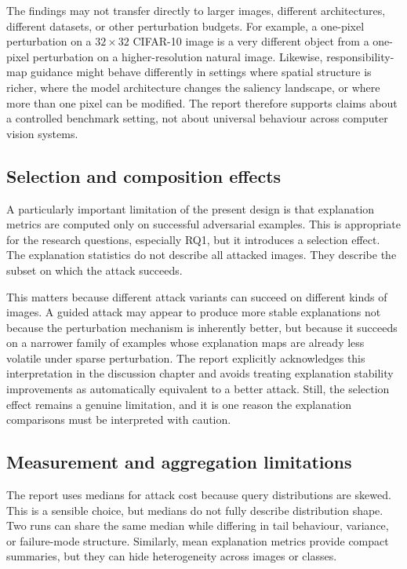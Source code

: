 The findings may not transfer directly to larger images, different architectures, different datasets, or other perturbation budgets.
For example, a one-pixel perturbation on a $32\times 32$ CIFAR-10 image is a very different object from a one-pixel perturbation on a higher-resolution natural image.
Likewise, responsibility-map guidance might behave differently in settings where spatial structure is richer, where the model architecture changes the saliency landscape, or where more than one pixel can be modified.
The report therefore supports claims about a controlled benchmark setting, not about universal behaviour across computer vision systems.

\subsection{Selection and composition effects}
A particularly important limitation of the present design is that explanation metrics are computed only on successful adversarial examples.
This is appropriate for the research questions, especially RQ1, but it introduces a selection effect.
The explanation statistics do not describe all attacked images.
They describe the subset on which the attack succeeds.

This matters because different attack variants can succeed on different kinds of images.
A guided attack may appear to produce more stable explanations not because the perturbation mechanism is inherently better, but because it succeeds on a narrower family of examples whose explanation maps are already less volatile under sparse perturbation.
The report explicitly acknowledges this interpretation in the discussion chapter and avoids treating explanation stability improvements as automatically equivalent to a better attack.
Still, the selection effect remains a genuine limitation, and it is one reason the explanation comparisons must be interpreted with caution.

\subsection{Measurement and aggregation limitations}
The report uses medians for attack cost because query distributions are skewed.
This is a sensible choice, but medians do not fully describe distribution shape.
Two runs can share the same median while differing in tail behaviour, variance, or failure-mode structure.
Similarly, mean explanation metrics provide compact summaries, but they can hide heterogeneity across images or classes.

